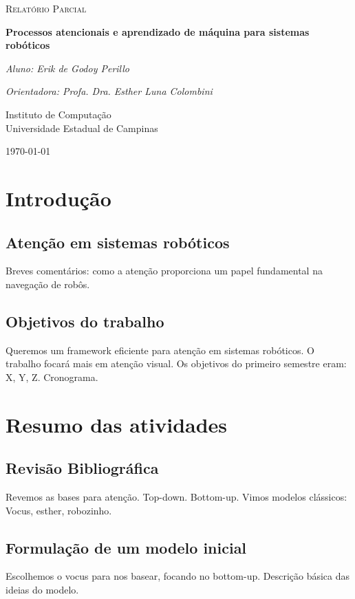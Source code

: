 \documentclass[11pt]{article}
\begin{document}
\begin{titlepage}
	\centering
	{\scshape\Large Relatório Parcial\par}
	\vspace{1.5cm}
	{\huge\bfseries Processos atencionais e aprendizado de máquina
		para sistemas robóticos\par}
	\vspace{1cm}
	{\itshape Aluno: Erik de Godoy Perillo\par}
	{\itshape Orientadora: Profa. Dra. Esther Luna Colombini\par}
	\vspace{0.5cm}
	\vfill
    Instituto de Computação\\
	Universidade Estadual de Campinas
	\vfill
	{\large \today\par}
\end{titlepage}

\newpage

\section{Introdução}
\subsection{Atenção em sistemas robóticos}
Breves comentários:
como a atenção proporciona um papel fundamental na navegação de robôs.

\subsection{Objetivos do trabalho}
Queremos um framework eficiente para atenção em sistemas robóticos.
O trabalho focará mais em atenção visual.
Os objetivos do primeiro semestre eram: X, Y, Z. Cronograma.


\section{Resumo das atividades}
\subsection{Revisão Bibliográfica}
Revemos as bases para atenção.
Top-down. Bottom-up.
Vimos modelos clássicos: Vocus, esther, robozinho.

\subsection{Formulação de um modelo inicial}
Escolhemos o vocus para nos basear, focando no bottom-up.
Descrição básica das ideias do modelo.
\end{document}
